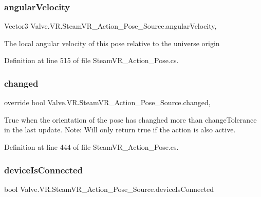 \subsubsection{\texorpdfstring{angularVelocity}{angularVelocity}}
{\footnotesize\ttfamily Vector3 Valve.\+V\+R.\+Steam\+V\+R\+\_\+\+Action\+\_\+\+Pose\+\_\+\+Source.\+angular\+Velocity\hspace{0.3cm}{\ttfamily [get]}, {}}



The local angular velocity of this pose relative to the universe origin 



Definition at line 515 of file Steam\+V\+R\+\_\+\+Action\+\_\+\+Pose.\+cs.

\mbox{\label{class_valve_1_1_v_r_1_1_steam_v_r___action___pose___source_abd28927b24762c29fed7b9debcf9bbc4}} 
\subsubsection{\texorpdfstring{changed}{changed}}
{\footnotesize\ttfamily override bool Valve.\+V\+R.\+Steam\+V\+R\+\_\+\+Action\+\_\+\+Pose\+\_\+\+Source.\+changed\hspace{0.3cm}{\ttfamily [get]}, {}}



True when the orientation of the pose has changhed more than change\+Tolerance in the last update. Note\+: Will only return true if the action is also active. 



Definition at line 444 of file Steam\+V\+R\+\_\+\+Action\+\_\+\+Pose.\+cs.

\mbox{\label{class_valve_1_1_v_r_1_1_steam_v_r___action___pose___source_a09c882d2b6f8a42326f275afcaa2f763}} 
\subsubsection{\texorpdfstring{deviceIsConnected}{deviceIsConnected}}
{\footnotesize\ttfamily bool Valve.\+V\+R.\+Steam\+V\+R\+\_\+\+Action\+\_\+\+Pose\+\_\+\+Source.\+device\+Is\+Connected\hspace{0.3cm}{\ttfamily [get]}}



